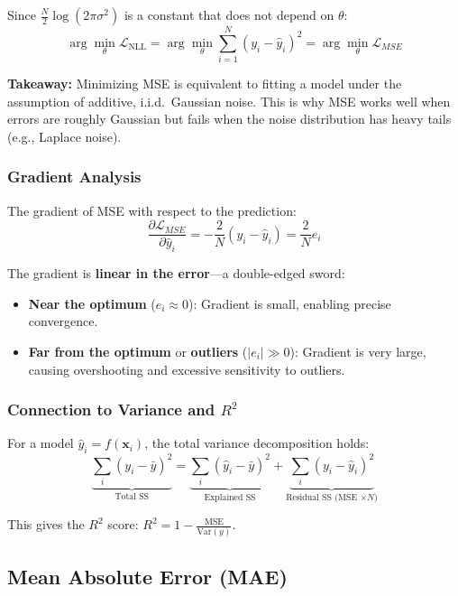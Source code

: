Since $\frac{N}{2}\log(2\pi\sigma^2)$ is a constant that does not depend on $\theta$:
\begin{equation}
\boxed{\arg\min_\theta \mathcal{L}_{\text{NLL}} = \arg\min_\theta \sum_{i=1}^{N}(y_i - \hat{y}_i)^2 = \arg\min_\theta \mathcal{L}_{MSE}}
\end{equation}

\textbf{Takeaway:} Minimizing MSE is equivalent to fitting a model under the assumption of additive, i.i.d.\ Gaussian noise. This is why MSE works well when errors are roughly Gaussian but fails when the noise distribution has heavy tails (e.g., Laplace noise).

\subsubsection{Gradient Analysis}

The gradient of MSE with respect to the prediction:
\begin{equation}
\frac{\partial \mathcal{L}_{MSE}}{\partial \hat{y}_i} = -\frac{2}{N}(y_i - \hat{y}_i) = \frac{2}{N}e_i
\end{equation}

The gradient is \textbf{linear in the error}---a double-edged sword:
\begin{itemize}
    \item \textbf{Near the optimum} ($e_i \approx 0$): Gradient is small, enabling precise convergence.
    \item \textbf{Far from the optimum} or \textbf{outliers} ($|e_i| \gg 0$): Gradient is very large, causing overshooting and excessive sensitivity to outliers.
\end{itemize}

\subsubsection{Connection to Variance and $R^2$}

For a model $\hat{y}_i = f(\mathbf{x}_i)$, the total variance decomposition holds:
\begin{equation}
\underbrace{\sum_i (y_i - \bar{y})^2}_{\text{Total SS}} = \underbrace{\sum_i (\hat{y}_i - \bar{y})^2}_{\text{Explained SS}} + \underbrace{\sum_i (y_i - \hat{y}_i)^2}_{\text{Residual SS (MSE $\times N$)}}
\end{equation}

This gives the $R^2$ score: $R^2 = 1 - \frac{\text{MSE}}{\text{Var}(y)}$.

\subsection{Mean Absolute Error (MAE)}

